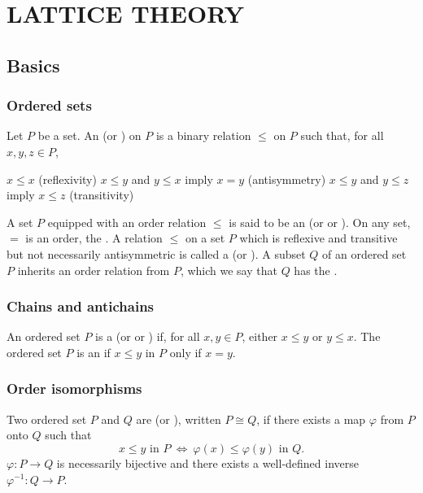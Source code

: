 \section{LATTICE THEORY}

\subsection{Basics}
\subsubsection{Ordered sets}
\bit
\w Let $P$ be a set. An  (or ) on $P$ is a binary
relation $\le$ on $P$ such that, for all $x, y, z \in P$, \vspace*{0.2cm} 
\\
\begin{minipage}{8cm}
 \ben
 \w [(a)] $x \le x$ \hfill (reflexivity)
 \w [(b)] $x \le y$ and $y \le x$ imply $x = y$ \hfill (antisymmetry)
 \w [(c)] $x \le y$ and $y \le z$ imply $x \le z$ \hfill (transitivity)
 \een
 \end{minipage}

\vspace*{0.2cm}

\w A set $P$ equipped with an order relation $\le$ is said to be an 
  (or  or ).
\w On any set, $=$ is an order, the .
\w A relation $\le$ on a set $P$ which is reflexive and transitive but not
necessarily antisymmetric is called a  (or ).
\w A subset $Q$ of an ordered set $P$ inherits an order relation from $P$,
which we say that $Q$ has the .
\eit
\subsubsection{Chains and antichains}
\bit
\w An ordered set $P$ is a  (or  or
) if, for all $x, y \in P$, either $x \le
y$ or $y \le x$.
\w The ordered set $P$ is an  if $x \le y$ in $P$ only if
 $x = y$.
\eit
\subsubsection{Order isomorphisms}
\bit
\w Two ordered set $P$ and $Q$ are  (or ),
written $P \cong Q$, if there exists a map $\varphi$ from $P$ onto $Q$
such that 
 \[ x \le y \mbox{\ in\ } P \ \Leftrightarrow\ \varphi(x) \le \varphi(y)
 \mbox{\ in\ } Q.\]
\w $\varphi: P \rightarrow Q$ is necessarily bijective and there exists a
well-defined inverse $\varphi^{-1}: Q \rightarrow P$.
\eit

